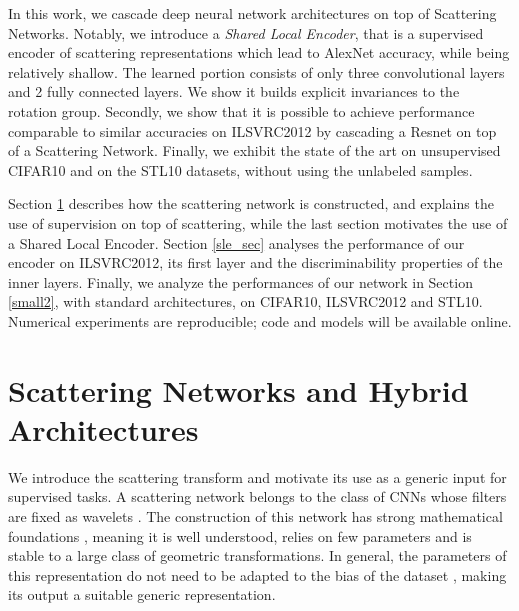 \documentclass[10pt,twocolumn,letterpaper]{article}
\newcommand{\citep}{\cite}
\begin{document}
In this work, we cascade deep neural network architectures on top of Scattering Networks. Notably, we introduce a \textit{Shared Local Encoder}, that is a supervised encoder of scattering representations which lead to AlexNet accuracy, while being relatively shallow. The learned portion consists of only three  convolutional layers and 2 fully connected layers. We show it builds explicit invariances to the rotation group. Secondly, we show that it is possible to achieve performance comparable to similar accuracies on ILSVRC2012 by cascading a Resnet \cite{he2015deep,zagoruyko2016wide} on top of a Scattering Network. Finally, we exhibit the state of the art on unsupervised CIFAR10 and on the STL10 datasets, without using the unlabeled samples.









Section \ref{hyb}  describes how the scattering network is constructed, and explains the use of supervision on top of scattering, while the last section motivates the use of a Shared Local Encoder. Section \ref{sle_sec} analyses the performance of our encoder on ILSVRC2012, its first layer and the discriminability properties of the inner layers. Finally, we analyze the performances of our network in Section \ref{small2}, with standard architectures, on CIFAR10, ILSVRC2012 and STL10. Numerical experiments are reproducible; code and models will be available online.
\fi




 
\section{Scattering Networks and Hybrid Architectures}
\label{hyb}









We introduce the scattering transform and motivate its use as a generic input for supervised tasks. A scattering network belongs to the class of CNNs whose filters are fixed as wavelets \citep{oyallon2015deep}. The construction of this network has strong mathematical foundations \citep{mallat2012group}, meaning it is well understood, relies on  few parameters and is stable to a large class of geometric transformations.  In general, the parameters of this representation do not need to be adapted to the bias of the dataset \citep{oyallon2015deep}, making its output a suitable generic representation.
 
\end{document}
